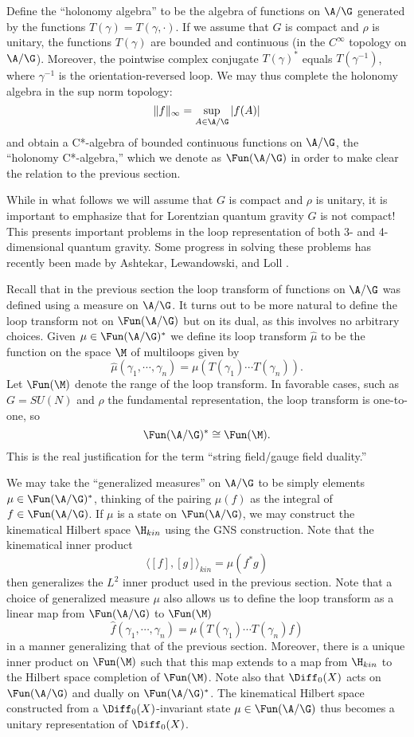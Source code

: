 Define the ``holonomy algebra'' to be the algebra of functions on
$\A/\G$ generated by the functions $T(\gamma) = T(\gamma,\cdot)$.
If we assume that $G$ is compact and $\rho$ is unitary, the functions
$T(\gamma)$ are bounded and continuous (in the $C^\infty$ topology on
$\A/\G$).  Moreover, the pointwise complex conjugate $T(\gamma)^\ast$ equals
$T(\gamma^{-1})$, where $\gamma^{-1}$ is the orientation-reversed
loop.  We may thus complete the holonomy algebra in the sup norm topology:
\[          \|f\|_\infty = \sup_{A \in \A/\G} |f(A)|  \]
and obtain a C*-algebra of bounded continuous functions on $\A/\G$,
the ``holonomy C*-algebra,'' which we denote as $\Fun(\A/\G)$ in order
to make clear the relation to the previous section.

While in what follows we will assume that $G$ is compact and $\rho$ is
unitary, it is important to emphasize that  for Lorentzian quantum gravity
$G$ is not compact!  This presents important problems in the loop
representation of both 3- and  4-dimensional quantum gravity.   Some
progress in solving these problems has recently been made by Ashtekar,
Lewandowski, and Loll \cite{AL,ALoll,Loll}.

Recall that in the previous section the loop transform of functions on
$\A/\G$ was defined using a measure on $\A/\G$.
It turns out to be more natural to define the loop transform not on
$\Fun(\A/\G)$ but on its dual, as this involves no arbitrary choices.
Given $\mu \in \Fun(\A/\G)^\ast$ we define its loop transform
$\hat\mu$ to be the function on the space $\M$ of multiloops given by
\[        \hat\mu(\gamma_1, \cdots, \gamma_n) =
 \mu(T(\gamma_1) \cdots T(\gamma_n))  .\]
Let $\Fun(\M)$ denote the range of the loop transform.  In favorable
cases, such as $G = SU(N)$ and $\rho$ the fundamental representation,
the loop transform is one-to-one, so
\[  \Fun(\A/\G)^\ast \cong \Fun(\M). \]
This is the real justification for the term ``string field/gauge field
duality.''

We may take the ``generalized measures'' on $\A/\G$ to be simply
elements $\mu \in \Fun(\A/\G)^\ast$, thinking of the pairing $\mu(f)$ as
the integral of $f \in \Fun(\A/\G)$.  If $\mu$ is a state on $\Fun(\A/\G)$, we
may construct the kinematical Hilbert space $\H_{kin}$
using the GNS construction.  Note that the kinematical
inner product
\[          \langle [f], [g] \rangle_{kin} = \mu(f^\ast g)  \]
then generalizes the $L^2$ inner product used in
the previous section.  Note that a choice of generalized measure $\mu$
also allows us to define the loop transform as a linear map from
$\Fun(\A/\G)$ to $\Fun(\M)$
\[        \hat f(\gamma_1, \cdots, \gamma_n) =
\mu(T(\gamma_1) \cdots T(\gamma_n)f)  \]
in a manner generalizing that of the previous section.  Moreover,
there is a unique inner product on $\Fun(\M)$ such that this map
extends to a map from $\H_{kin}$ to the Hilbert space completion of
$\Fun(\M)$.
Note also that $\Diff_0(X)$ acts on $\Fun(\A/\G)$
and dually on $\Fun(\A/\G)^\ast$.  The kinematical Hilbert space
constructed from a $\Diff_0(X)$-invariant state $\mu \in \Fun(\A/\G)$
thus becomes a unitary representation of $\Diff_0(X)$.

